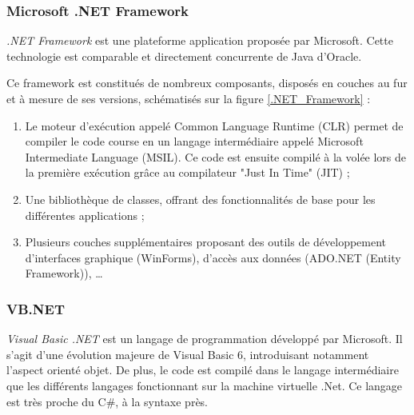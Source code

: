 
\subsubsection{Microsoft .NET Framework}

\textit{.NET Framework} est une plateforme application proposée par Microsoft. Cette technologie est comparable et directement concurrente de Java d'Oracle.

Ce framework est constitués de nombreux composants, disposés en couches au fur et à mesure de ses versions, schématisés sur la figure \ref{.NET_Framework} :
\begin{enumerate}
	\item Le moteur d'exécution appelé Common Language Runtime (CLR) permet de compiler le code course en un langage intermédiaire appelé Microsoft Intermediate Language (MSIL). Ce code est ensuite compilé à la volée lors de la première exécution grâce au compilateur "Just In Time" (JIT) ;
	\item Une bibliothèque de classes, offrant des fonctionnalités de base pour les différentes applications ;
	\item Plusieurs couches supplémentaires proposant des outils de développement d'interfaces graphique (WinForms), d'accès aux données (ADO.NET (Entity Framework)), \ldots
\end{enumerate}


\subsubsection{VB.NET}

\textit{Visual Basic .NET} est un langage de programmation développé par Microsoft. Il s'agit d'une évolution majeure de Visual Basic 6, introduisant notamment l'aspect orienté objet. De plus, le code est compilé dans le langage intermédiaire que les différents langages fonctionnant sur la machine virtuelle .Net. Ce langage est très proche du C\#, à la syntaxe près.

